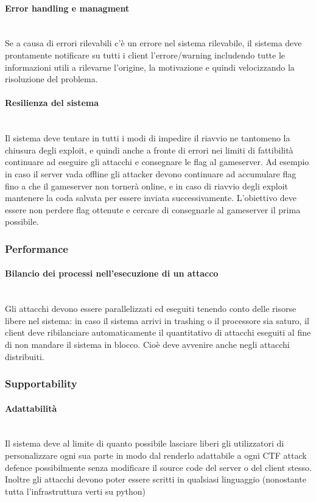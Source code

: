 \documentclass[11pt]{article}
\begin{document}
\paragraph{Error handling e managment}\mbox{}\\
Se a causa di errori rilevabili c'è un errore nel sistema rilevabile, il sistema deve prontamente notificare su tutti i client l'errore/warning includendo tutte le informazioni utili a rilevarne l'origine, la motivazione  e quindi velocizzando la risoluzione del problema.
\paragraph{Resilienza del sistema}\mbox{}\\
Il sistema deve tentare in tutti i modi di impedire il riavvio ne tantomeno la chiusura degli exploit, e quindi anche a fronte di errori nei limiti di fattibilità continuare ad eseguire gli attacchi e consegnare le flag al gameserver. Ad esempio in caso il server vada offline gli attacker devono continuare ad accumulare flag fino a che il gameserver non tornerà online, e in caso di riavvio degli exploit mantenere la coda salvata per essere inviata successivamente. L'obiettivo deve essere non perdere flag ottenute e cercare di consegnarle al gameserver il prima possibile.
\subsubsection{Performance}
\paragraph{Bilancio dei processi nell'esecuzione di un attacco}\mbox{}\\
Gli attacchi devono essere parallelizzati ed eseguiti tenendo conto delle risorse libere nel sistema: in caso il sistema arrivi in trashing o il processore sia saturo, il client deve ribilanciare automaticamente il quantitativo di attacchi eseguiti al fine di non mandare il sistema in blocco. Cioè deve avvenire anche negli attacchi distribuiti.
\subsubsection{Supportability}
\paragraph{Adattabilità}\mbox{}\\
Il sistema deve al limite di quanto possibile lasciare liberi gli utilizzatori di personalizzare ogni sua parte in modo dal renderlo adattabile a ogni CTF attack defence possibilmente senza modificare il source code del server o del client stesso. Inoltre gli attacchi devono poter essere scritti in qualsiasi linguaggio (nonostante tutta l'infrastruttura verti su python)
\end{document}
